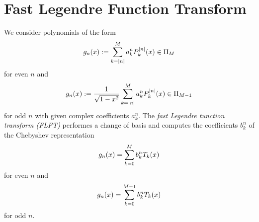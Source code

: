 

\section{Fast Legendre Function Transform}
\label{DSFT:FLFT}

We consider polynomials of the form
$$ g_n{\hspace{-0.4ex}}\left(x\right) := \sum_{k=\left\vert n\right\vert}^M a_k^n P_k^{\left\vert n\right\vert}{\hspace{-0.4ex}}\left(x\right) \in \Pi_M$$
for even $n$ and
$$ g_n{\hspace{-0.4ex}}\left(x\right) := \frac{1}{\sqrt{1-x^2}} \sum_{k=\left\vert n\right\vert}^M a_k^n P_k^{\left\vert n\right\vert}{\hspace{-0.4ex}}\left(x\right) \in \Pi_{M-1}$$
for odd $n$ with given complex coefficients $a_k^n$. The \emph{fast Legendre tunction transform (FLFT)} performes a change of basis and computes the 
coefficients $b_k^n$ of the Chebyshev representation
$$ g_n{\hspace{-0.4ex}}\left(x\right) = \sum_{k=0}^M b_k^n T_k{\hspace{-0.4ex}}\left(x\right)$$
for even $n$ and
$$g_n{\hspace{-0.4ex}}\left(x\right) = \sum_{k=0}^{M-1} b_k^n T_k{\hspace{-0.4ex}}\left(x\right)$$
for odd $n$.

